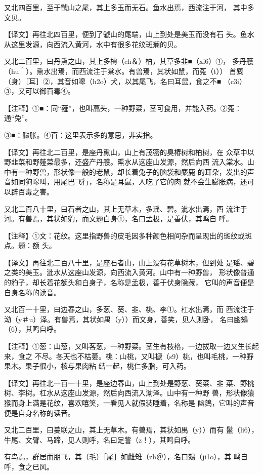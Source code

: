 \documentclass[a4paper,12pt,UTF8,twoside]{ctexbook}
\begin{document}
又北四百里，至于虢山之尾，其上多玉而无石。鱼水出焉，西流注于河， 其中多文贝。

【译文】再往北四百里，便到了虢山的尾端，山上到处是美玉而没有石 头。鱼水从这里发源，向西流入黄河，水中有很多花纹斑斓的贝。

又北二百里，曰丹熏之山，其上多樗（ch＆）柏，其草多韭■（xi6）①， 多丹雘（hu＾）。熏水出焉，而西流注于棠水。有兽焉，其状如鼠，而菟（t）） 首麋（身）［耳］②，其音如嗥（h2o）犬，以其尾飞，名曰耳鼠，食之不■ （c3i）③，又可以御百毒④。

【注释】①■：同“薤”，也叫蕌头，一种野菜，茎可食用，并能入药。②菟：通“兔”。

③■：臌胀。④百：这里表示多的意思，非实指。

【译文】再往北二百里，是座丹熏山，山上有茂密的臭椿树和柏树，在 众草中以野韭菜和野薤菜最多，还盛产丹雘。熏水从这座山发源，然后向西 流入棠水。山中有一种野兽，形状像一般的老鼠，却长着兔子的脑袋和麋鹿 的耳朵，发出的声音如同狗嗥叫，用尾巴飞行，名称是耳鼠，人吃了它的肉 就不会生膨胀病，还可以辟百毒之害。

又北二百八十里，曰石者之山，其上无草木，多瑶、碧。泚水出焉，西 流注于河。有兽焉，其状如豹，而文题白身①，名曰孟极，是善伏，其鸣自 呼。

【注释】①文：花纹。这里指野兽的皮毛因多种颜色相间杂而呈现出的斑纹或斑点。题：额 头。

【译文】再往北二百八十里，是座石者山，山上没有花草树木，但到处 是瑶、碧之类的美玉。泚水从这座山发源，向西流入黄河。山中有一种野兽， 形状像普通的豹子，却长着花额头和白身子，名称是孟极，善于伏身隐藏， 它叫的声音便是自身名称的读音。

又北百一十里，曰边春之山，多葱、葵、韭、桃、李①。杠水出焉，而 西流注于泑（y＃u）泽。有兽焉，其状如禺（y））而文身，善笑，见人则卧， 名曰幽鴳（6），其鸣自呼。

【注释】①葱：山葱，又叫茖葱，一种野菜。茎生有枝格，一边拔取一边又生长起来，食之 不尽。冬天也不枯萎。桃：山桃，又叫榹（s9）桃，也叫毛桃，一种野果木。果子很小，核与果肉粘 结一起，桃仁多脂，可入药。

【译文】再往北一百一十里，是座边春山，山上到处是野葱、葵菜、韭 菜、野桃树、李树。杠水从这座山发源，然后向西流入泑泽。山中有一种野 兽，形状像猿猴而身上满是花纹，喜欢嘻笑，一看见人就假装睡着，名称是 幽鴳，它叫的声音便是自身名称的读音。

又北二百里，曰蔓联之山，其上无草木。有兽焉，其状如禺（y））而有 鬣（li6），牛尾、文臂、马蹄，见人则呼，名曰足訾（z！），其鸣自呼。

有鸟焉，群居而朋飞，其（毛）［尾］如雌雉（zh＠），名曰鵁（ji1o），其 鸣自呼，食之已风。
\end{document}
